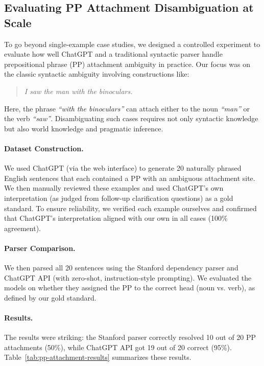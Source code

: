 \subsection{Evaluating PP Attachment Disambiguation at Scale}
\label{subsec:pp-attachment-bulk}

To go beyond single-example case studies, we designed a controlled experiment to evaluate how well ChatGPT and a traditional syntactic parser handle prepositional phrase (PP) attachment ambiguity in practice. Our focus was on the classic syntactic ambiguity involving constructions like:

\begin{quote}
    \textit{I saw the man with the binoculars.}
\end{quote}

Here, the phrase \textit{“with the binoculars”} can attach either to the noun \textit{“man”} or the verb \textit{“saw”}. Disambiguating such cases requires not only syntactic knowledge but also world knowledge and pragmatic inference.

\paragraph{Dataset Construction.}
We used ChatGPT (via the web interface) to generate 20 naturally phrased English sentences that each contained a PP with an ambiguous attachment site. We then manually reviewed these examples and used ChatGPT's own interpretation (as judged from follow-up clarification questions) as a gold standard. To ensure reliability, we verified each example ourselves and confirmed that ChatGPT's interpretation aligned with our own in all cases (100\% agreement).

\paragraph{Parser Comparison.}
We then parsed all 20 sentences using the Stanford dependency parser and ChatGPT API (with zero-shot, instruction-style prompting). We evaluated the models on whether they assigned the PP to the correct head (noun vs. verb), as defined by our gold standard.

\paragraph{Results.}
The results were striking: the Stanford parser correctly resolved 10 out of 20 PP attachments (50\%), while ChatGPT API got 19 out of 20 correct (95\%). Table~\ref{tab:pp-attachment-results} summarizes these results.

